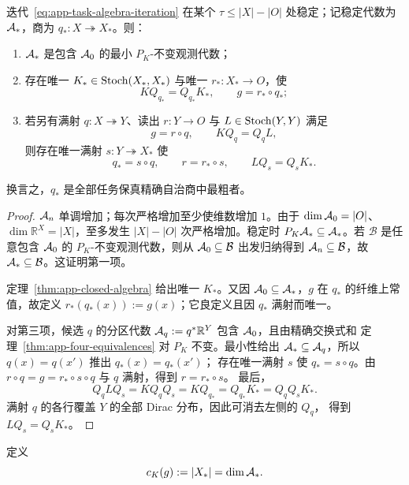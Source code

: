 \begin{theorem}[任务相对的最小精确宏观模型]
\label{thm:app-minimal-task-quotient}
迭代~\eqref{eq:app-task-algebra-iteration} 在某个
$\tau\le |X|-|O|$ 处稳定；记稳定代数为 $\mathcal A_*$，商为
$q_*:X\twoheadrightarrow X_*$。则：
\begin{enumerate}
  \item $\mathcal A_*$ 是包含 $\mathcal A_0$ 的最小 $P_K$-不变观测代数；
  \item 存在唯一 $K_*\in\operatorname{Stoch}(X_*,X_*)$ 与唯一 $r_*:X_*\to O$，使
  \begin{equation}
    KQ_{q_*}=Q_{q_*}K_*,
    \qquad
    g=r_*\circ q_*;
    \label{eq:app-minimal-task-square}
  \end{equation}
  \item 若另有满射 $q:X\twoheadrightarrow Y$、读出 $r:Y\to O$ 与
  $L\in\operatorname{Stoch}(Y,Y)$ 满足
  \[
    g=r\circ q,
    \qquad
    KQ_q=Q_qL,
  \]
  则存在唯一满射 $s:Y\twoheadrightarrow X_*$ 使
  \begin{equation}
    q_*=s\circ q,
    \qquad r=r_*\circ s,
    \qquad LQ_s=Q_sK_*.
    \label{eq:app-minimal-universal-property}
  \end{equation}
\end{enumerate}
换言之，$q_*$ 是全部任务保真精确自治商中最粗者。
\end{theorem}

\begin{proof}
$\mathcal A_n$ 单调增加；每次严格增加至少使维数增加 $1$。由于
$\dim\mathcal A_0=|O|$、$\dim\mathbb R^X=|X|$，至多发生
$|X|-|O|$ 次严格增加。稳定时
$P_K\mathcal A_*\subseteq\mathcal A_*$。若 $\mathcal B$ 是任意包含 $\mathcal A_0$ 的
$P_K$-不变观测代数，则从 $\mathcal A_0\subseteq\mathcal B$ 出发归纳得到
$\mathcal A_n\subseteq\mathcal B$，故 $\mathcal A_*\subseteq\mathcal B$。这证明第一项。

定理~\ref{thm:app-closed-algebra} 给出唯一 $K_*$。又因
$\mathcal A_0\subseteq\mathcal A_*$，$g$ 在 $q_*$ 的纤维上常值，故定义
$r_*(q_*(x)):=g(x)$；它良定义且因 $q_*$ 满射而唯一。

对第三项，候选 $q$ 的分区代数
$\mathcal A_q:=q^*\mathbb R^Y$ 包含 $\mathcal A_0$，且由精确交换式和
定理~\ref{thm:app-four-equivalences} 对 $P_K$ 不变。最小性给出
$\mathcal A_*\subseteq\mathcal A_q$，所以 $q(x)=q(x')$ 推出 $q_*(x)=q_*(x')$；
存在唯一满射 $s$ 使 $q_*=s\circ q$。由
$r\circ q=g=r_*\circ s\circ q$ 与 $q$ 满射，得到 $r=r_*\circ s$。
最后，
\[
 Q_qLQ_s=KQ_qQ_s=KQ_{q_*}
 =Q_{q_*}K_*=Q_qQ_sK_*.
\]
满射 $q$ 的各行覆盖 $Y$ 的全部 Dirac 分布，因此可消去左侧的 $Q_q$，
得到 $LQ_s=Q_sK_*$。
\end{proof}

\begin{definition}[精确任务相对自治复杂度]
\label{def:app-exact-complexity}
定义
\begin{equation}
 c_K(g):=|X_*|=\dim\mathcal A_*.
 \label{eq:app-exact-complexity}
\end{equation}
\end{definition}

